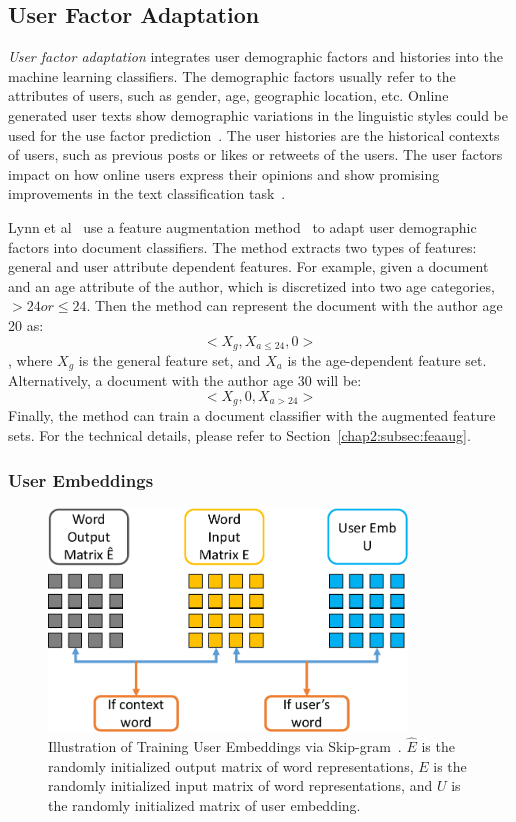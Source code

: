 \subsection{User Factor Adaptation}

\textit{User factor adaptation} integrates user demographic factors and histories into the machine learning classifiers. The demographic factors usually refer to the attributes of users, such as gender, age, geographic location, etc. Online generated user texts show demographic variations in the linguistic styles could be used for the use factor prediction~\cite{rosenthal2011age, zhang2016predicting, hovy2018improving}. The user histories are the historical contexts of users, such as previous posts or likes or retweets of the users. The user factors impact on how online users express their opinions and show promising improvements in the text classification task~\cite{volkova2013exploring, hovy2015demographic, lynn2017human, yang2017overcoming}.

Lynn et al~\cite{lynn2017human} use a feature augmentation method~\cite{daume2007frustratingly} to adapt user demographic factors into document classifiers.
The method extracts two types of features: general and user attribute dependent features. 
For example, given a document and an age attribute of the author, which is discretized into two age categories, $>24 or \leq 24$.
Then the method can represent the document with the author age 20 as:
$$<X_g, X_{a\leq24}, 0>$$
, where $X_g$ is the general feature set, and $X_a$ is the age-dependent feature set.
Alternatively, a document with the author age 30 will be:
$$<X_g, 0, X_{a>24}>$$
Finally, the method can train a document classifier with the augmented feature sets.
For the technical details, please refer to Section~\ref{chap2:subsec:feaaug}.


\subsubsection{User Embeddings}

\begin{figure}[tb!]
\centering
\includegraphics[width=0.85\textwidth]{images/chapter2/user-emb.pdf}
\caption{Illustration of Training User Embeddings via Skip-gram~\cite{amir2017quantifying}. $\hat{E}$ is the randomly initialized output matrix of word representations, $E$ is the randomly initialized input matrix of word representations, and $U$ is the randomly initialized matrix of user embedding.}
\label{chap2:fig:user}
\end{figure}

